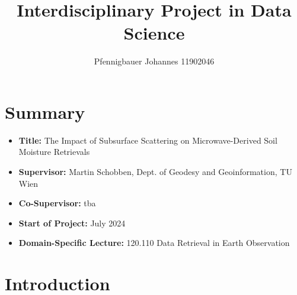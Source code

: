 \documentclass[12pt]{article}
\title{Interdisciplinary Project in Data Science}
\author{Pfennigbauer Johannes 11902046}
\begin{document}
\maketitle

\section{Summary}
\begin{itemize}[label=]
    \item \textbf{Title:} The Impact of Subsurface Scattering on Microwave-Derived Soil Moisture Retrievals
    \item \textbf{Supervisor:} Martin Schobben, Dept. of Geodesy and Geoinformation, TU Wien
    \item \textbf{Co-Supervisor:} tba
    \item \textbf{Start of Project:} July 2024
    \item \textbf{Domain-Specific Lecture:} 120.110 Data Retrieval in Earth Observation
\end{itemize}

\section{Introduction}
\end{document}
